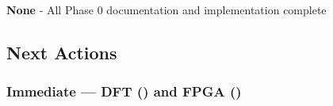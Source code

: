 \begin{record}

\textbf{None} - All Phase 0 documentation and implementation complete

\end{record}

\subsection{Next Actions}\label{cr:status:phase-status:next-actions}

\subsubsection{\texorpdfstring{Immediate --- DFT () and FPGA
()}{Immediate --- DFT () and FPGA ()}}\label{cr:status:phase-status:immediate-dft-j41m-and-fpga-hlrm}

